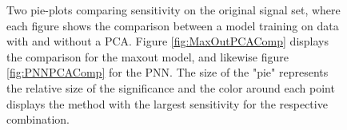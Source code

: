 \begin{figure}
    \caption{Two pie-plots comparing sensitivity on the original signal set, where each figure shows the comparison between a model training on data 
    with and without a \ac{PCA}. Figure \ref{fig:MaxOutPCAComp} displays the comparison for the maxout model, and likewise figure \ref{fig:PNNPCAComp} 
    for the \ac{PNN}. The size of the "pie" represents the relative size of the significance and the color around each 
    point displays the method with the largest sensitivity for the respective combination.}
    \label{fig:PCAComp2}
\end{figure}
